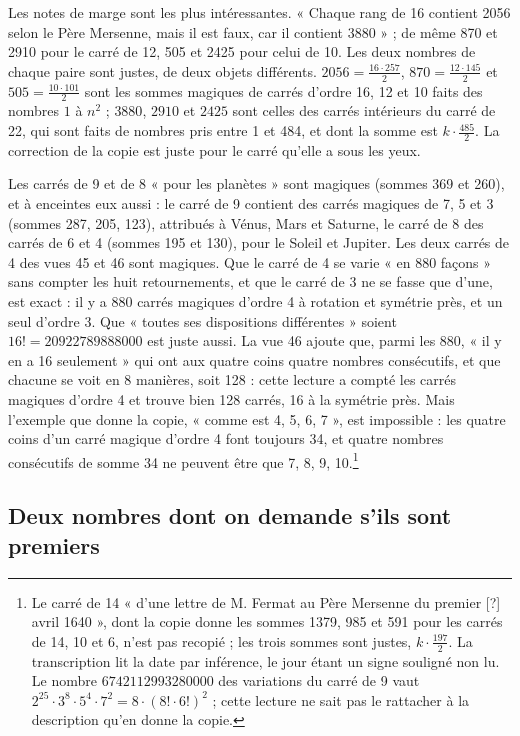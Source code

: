 \documentclass[11pt,a4paper]{article}
\begin{document}
Les notes de marge sont les plus intéressantes. « Chaque rang de 16 contient
2056 selon le Père Mersenne, mais il est faux, car il contient 3880 » ; de même
870 et 2910 pour le carré de 12, 505 et 2425 pour celui de 10. Les deux nombres
de chaque paire sont justes, de deux objets différents. $2056 =
\frac{16 \cdot 257}{2}$, $870 = \frac{12 \cdot 145}{2}$ et $505 =
\frac{10 \cdot 101}{2}$ sont les sommes magiques de carrés d'ordre 16, 12 et 10
faits des nombres $1$ à $n^2$ ; $3880$, $2910$ et $2425$ sont celles des carrés
intérieurs du carré de 22, qui sont faits de nombres pris entre 1 et 484, et dont
la somme est $k \cdot \frac{485}{2}$. La correction de la copie est juste pour le
carré qu'elle a sous les yeux.

Les carrés de 9 et de 8 « pour les planètes » sont magiques (sommes 369 et 260), et
à enceintes eux aussi : le carré de 9 contient des carrés magiques de 7, 5 et 3
(sommes 287, 205, 123), attribués à Vénus, Mars et Saturne, le carré de 8 des
carrés de 6 et 4 (sommes 195 et 130), pour le Soleil et Jupiter. Les deux carrés
de 4 des vues 45 et 46 sont magiques. Que le carré de 4 se varie « en 880
façons » sans compter les huit retournements, et que le carré de 3 ne se fasse
que d'une, est exact : il y a 880 carrés magiques d'ordre 4 à rotation et
symétrie près, et un seul d'ordre 3. Que « toutes ses dispositions différentes »
soient $16! = 20922789888000$ est juste aussi. La vue 46 ajoute que, parmi les 880,
« il y en a 16 seulement » qui ont aux quatre coins quatre nombres consécutifs, et
que chacune se voit en 8 manières, soit 128 : cette lecture a compté les carrés
magiques d'ordre 4 et trouve bien 128 carrés, 16 à la symétrie près. Mais
l'exemple que donne la copie, « comme est 4, 5, 6, 7 », est impossible : les
quatre coins d'un carré magique d'ordre 4 font toujours 34, et quatre nombres
consécutifs de somme 34 ne peuvent être que 7, 8, 9, 10.\footnote{Le carré de 14
« d'une lettre de M. Fermat au Père Mersenne du premier [?] avril 1640 », dont
la copie donne les sommes 1379, 985 et 591 pour les carrés de 14, 10 et 6, n'est
pas recopié ; les trois sommes sont justes, $k \cdot \frac{197}{2}$. La
transcription lit la date par inférence, le jour étant un signe souligné non
lu. Le nombre $6742112993280000$ des variations du carré de 9 vaut
$2^{25} \cdot 3^8 \cdot 5^4 \cdot 7^2 = 8 \cdot (8! \cdot 6!)^2$ ; cette lecture
ne sait pas le rattacher à la description qu'en donne la copie.}

\subsection*{Deux nombres dont on demande s'ils sont premiers}
\end{document}
